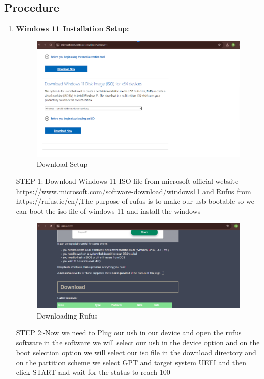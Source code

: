 \documentclass[a4paper,9pt]{article}
\begin{document}
	\subsection{Procedure}
	\begin{enumerate}
		\item \textbf{Windows 11 Installation Setup:}
		
		\begin{figure}[H]
			\centering
			\includegraphics[width=0.8\linewidth]{1.1.png}
			\caption{Download Setup}
		\end{figure}
		STEP 1:-Download Windows 11 ISO file from microsoft official website
		https://www.microsoft.com/software-download/windows11 and Rufus from https://rufus.ie/en/,The purpose of rufus is to make our usb bootable so we can boot the iso file of windows 11 and install the windows
		\begin{figure}[H]
			\centering
			\includegraphics[width=0.8\linewidth]{1.2.png}
			\caption{Downloading Rufus}
		\end{figure}
		STEP 2:-Now we need to Plug our usb in our device and open the rufus software in the software we will select our usb in the device option and on the boot selection option we will select our iso file in the download directory and on the partition scheme we select GPT and target system UEFI and then click START and wait for the status to reach 100%
		

\end{enumerate}
\end{document}
